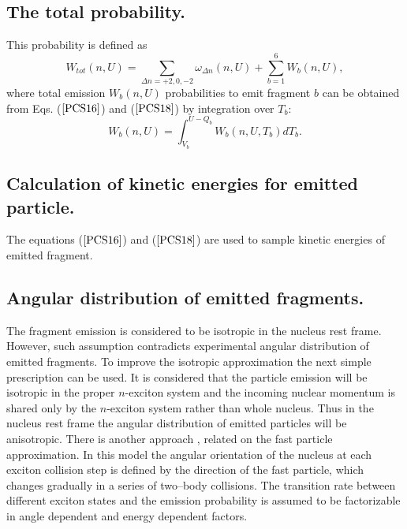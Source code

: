 \subsection{The total  probability.}

\hspace{1.0em}This probability is defined as 
\begin{equation}
\label{PCS20} W_{tot}(n,U) =\sum_{\Delta n =+2,0,-2}\omega_{\Delta n }(n,U) +
\sum_{b=1}^{6}W_b(n,U),
\end{equation} 
where total emission $W_b(n,U)$ probabilities to emit fragment $b$ can
be obtained from Eqs. ($\ref{PCS16}$) and ($\ref{PCS18}$) by
integration over $T_b$:
\begin{equation}
\label{PCS21} 
W_{b}(n,U)=\int_{V_b}^{U-Q_b} W_b(n,U,T_b)dT_b.
\end{equation}

 
\subsection{Calculation of kinetic energies for emitted particle.}

\hspace{1.0em}The equations ($\ref{PCS16}$) and ($\ref{PCS18}$)
 are
 used to sample kinetic energies of emitted fragment.

\subsection{Angular distribution of emitted fragments.}

\hspace{1.0em}The fragment  emission is considered to be isotropic  in
the nucleus rest frame. However, such assumption contradicts
experimental angular distribution of emitted fragments.  To improve the
isotropic approximation the next simple prescription \cite{GMT83} can be
used.  It is considered that the particle emission will be isotropic in
the proper $n$-exciton system and the incoming nuclear momentum is
shared only by the $n$-exciton system rather than whole nucleus. Thus in
the nucleus rest frame the angular distribution of emitted particles
will be anisotropic. 
There is another approach \cite{Mant75}, \cite{Akker80} 
related on the fast particle approximation. In this model the angular
orientation of the nucleus at each exciton collision step is defined by the 
direction of the fast particle, which changes gradually in a series of
two--body collisions. The transition rate between different exciton states and 
the emission probability is assumed to be factorizable in  angle dependent
and energy dependent factors.

